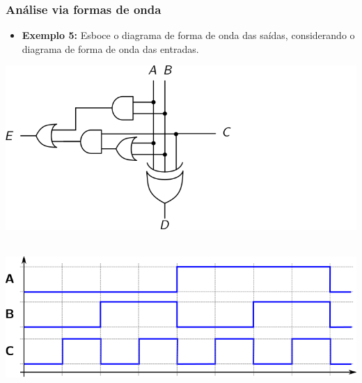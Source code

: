 \documentclass{beamer}
\begin{document}
\begin{frame}
\frametitle{Análise via formas de onda}

\begin{itemize}
\item \textbf{Exemplo 5:} Esboce o diagrama de forma de onda das saídas,
considerando o diagrama de forma de onda das entradas.
\end{itemize}
\begin{center}
\begin{minipage}{0.5\textwidth}
\includegraphics[scale=0.7]{images/analise2}
\end{minipage}
\begin{minipage}{0.4\textwidth}
\end{minipage}\\
\includegraphics[scale=0.7]{images/waveform5}
\end{center}

\end{frame}

\end{document}
